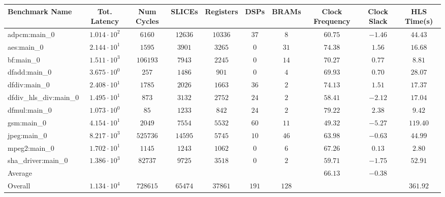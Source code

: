 \begin{tabular}{|l|c|c|c|c|c|c|c|c|c|}
\hline
Benchmark Name          & Tot. Latency           & Num Cycles & SLICEs    & Registers & DSPs    & BRAMs   & Clock Frequency & Clock Slack & HLS Time(s) \\
\hline
adpcm:main\_0           & $ 1.014 \cdot 10^{2} $ & $ 6160   $ & $ 12636 $ & $ 10336 $ & $ 37  $ & $ 8   $ & $ 60.75       $ & $ -1.46   $ & $ 44.43   $ \\
aes:main\_0             & $ 2.144 \cdot 10^{1} $ & $ 1595   $ & $ 3901  $ & $ 3265  $ & $ 0   $ & $ 31  $ & $ 74.38       $ & $ 1.56    $ & $ 16.68   $ \\
bf:main\_0              & $ 1.511 \cdot 10^{3} $ & $ 106193 $ & $ 7943  $ & $ 2245  $ & $ 0   $ & $ 14  $ & $ 70.27       $ & $ 0.77    $ & $ 8.81    $ \\
dfadd:main\_0           & $ 3.675 \cdot 10^{0} $ & $ 257    $ & $ 1486  $ & $ 901   $ & $ 0   $ & $ 4   $ & $ 69.93       $ & $ 0.70    $ & $ 28.07   $ \\
dfdiv:main\_0           & $ 2.408 \cdot 10^{1} $ & $ 1785   $ & $ 2026  $ & $ 1663  $ & $ 36  $ & $ 2   $ & $ 74.13       $ & $ 1.51    $ & $ 17.37   $ \\
dfdiv\_hls\_div:main\_0 & $ 1.495 \cdot 10^{1} $ & $ 873    $ & $ 3132  $ & $ 2752  $ & $ 24  $ & $ 2   $ & $ 58.41       $ & $ -2.12   $ & $ 17.04   $ \\
dfmul:main\_0           & $ 1.073 \cdot 10^{0} $ & $ 85     $ & $ 1233  $ & $ 842   $ & $ 24  $ & $ 2   $ & $ 79.22       $ & $ 2.38    $ & $ 9.42    $ \\
gsm:main\_0             & $ 4.154 \cdot 10^{1} $ & $ 2049   $ & $ 7554  $ & $ 5532  $ & $ 60  $ & $ 11  $ & $ 49.32       $ & $ -5.27   $ & $ 119.40  $ \\
jpeg:main\_0            & $ 8.217 \cdot 10^{3} $ & $ 525736 $ & $ 14595 $ & $ 5745  $ & $ 10  $ & $ 46  $ & $ 63.98       $ & $ -0.63   $ & $ 44.99   $ \\
mpeg2:main\_0           & $ 1.702 \cdot 10^{1} $ & $ 1145   $ & $ 1243  $ & $ 1062  $ & $ 0   $ & $ 6   $ & $ 67.26       $ & $ 0.13    $ & $ 2.80    $ \\
sha\_driver:main\_0     & $ 1.386 \cdot 10^{3} $ & $ 82737  $ & $ 9725  $ & $ 3518  $ & $ 0   $ & $ 2   $ & $ 59.71       $ & $ -1.75   $ & $ 52.91   $ \\
\hline
Average                 & $                    $ & $        $ & $       $ & $       $ & $     $ & $     $ & $ 66.13       $ & $ -0.38   $ & $         $ \\
\hline
Overall                 & $ 1.134 \cdot 10^{4} $ & $ 728615 $ & $ 65474 $ & $ 37861 $ & $ 191 $ & $ 128 $ & $             $ & $         $ & $ 361.92  $ \\
\hline
\end{tabular}
